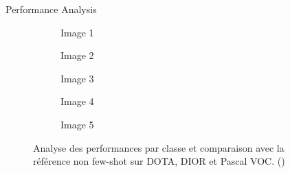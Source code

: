\begin{subsectionframemod}{Performance Analysis}

    \begin{figure}
        \centering
        \begin{subfigure}{0.32\textwidth}
            
            \caption{Image 1}
        \end{subfigure}
        \begin{subfigure}{0.32\textwidth}
            
            \caption{Image 2}
        \end{subfigure}
        \begin{subfigure}{0.32\textwidth}
            
            \caption{Image 3}
        \end{subfigure}
        \begin{subfigure}{0.32\textwidth}
            
            \caption{Image 4}
        \end{subfigure}
        \begin{subfigure}{0.32\textwidth}
            
            \caption{Image 5}
        \end{subfigure}
        \caption{Analyse des performances par classe et comparaison avec la référence non few-shot sur DOTA, DIOR et Pascal VOC. (\cite{lejeune2022improving})}
    \end{figure}

\end{subsectionframemod}